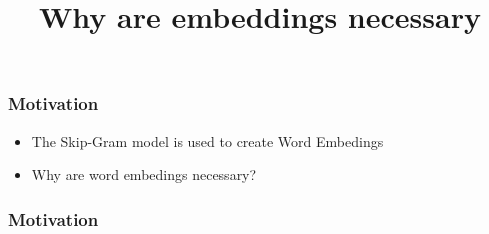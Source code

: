 \begin{frame}\frametitle{Motivation}
\begin{itemize}
    \item The Skip-Gram model is used to create Word Embedings
    \item Why are word embedings necessary? 
\end{itemize}
\end{frame}
\begin{frame}\frametitle {Motivation}
    \title{Why are embeddings necessary}


\end{frame}
